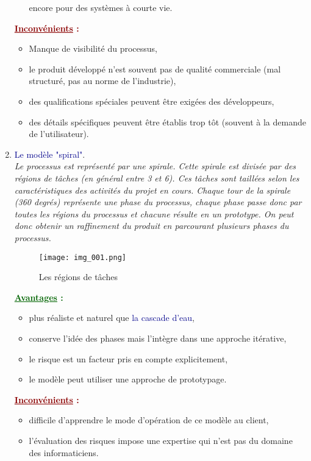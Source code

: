 \documentclass{article}
\newcommand{\gre}[1]{\textcolor{darkgreen}{#1}}
\newcommand{\blu}[1]{\textcolor{darkblue}{#1}}
\newcommand{\rouge}[1]{\textcolor{darkred}{#1}}
\begin{document}
\begin{sffamily}
\begin{enumerate}
\begin{itemize}
	encore pour des systèmes à courte vie.
	\end{itemize}
\rouge{\textbf{\underline{Inconvénients} :}}
	\begin{itemize}
	\item Manque de visibilité du processus,
	\item le produit développé n'est souvent pas de qualité commerciale (mal structuré, pas au norme de l'industrie),
	\item des qualifications spéciales peuvent être exigées des développeurs,
	\item des détails spécifiques peuvent être établis trop tôt (souvent à la demande de l'utilisateur).
	\end{itemize}
	
\item \blu{Le modèle "spiral"}.\\
\textit{Le processus est représenté par une spirale. Cette spirale est divisée par des régions de tâches (en général entre 3 et 
6). Ces tâches sont taillées selon les caractéristiques des activités du projet en cours. Chaque tour de la spirale (360 degrés) 
représente une phase du processus, chaque phase passe donc par toutes les régions du processus et chacune résulte en un 
prototype. On peut donc obtenir un raffinement du produit en parcourant plusieurs phases du processus.}\\

\begin{figure}[h!]
    \begin{center}
    \texttt{[image: img\_001.png]}
    \caption{Les régions de tâches}
    \end{center}	
\end{figure}

\gre{\textbf{\underline{Avantages} :}}
	\begin{itemize}
	\item plus réaliste et naturel que \blu{la cascade d'eau},
	\item conserve l'idée des phases mais l'intègre dans une approche itérative,
	\item le risque est un facteur pris en compte explicitement,
	\item le modèle peut utiliser une approche de prototypage.
	\end{itemize}
\rouge{\textbf{\underline{Inconvénients} :}}
	\begin{itemize}
	\item difficile d'apprendre le mode d'opération de ce modèle au client,
	\item l'évaluation des risques impose une expertise qui n'est pas du domaine des informaticiens.
	\end{itemize}


\end{enumerate}
\end{sffamily}
\end{document}
